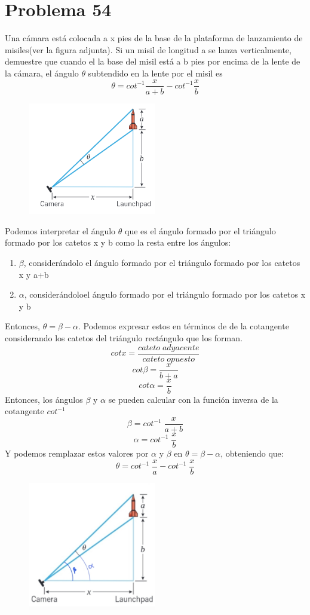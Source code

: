 \documentclass[12pt]{article}
\begin{document}
\section{Problema 54}
Una cámara está colocada a x pies de la base de la 
plataforma de lanzamiento de misiles(ver la figura adjunta). Si un misil
de longitud a se lanza verticalmente, demuestre que cuando el
la base del misil está a b pies por encima de la lente de la cámara, el ángulo $\theta $ subtendido en la lente por el misil es
\[
\theta  = cot ^{-1} \frac{x}{a+b} - cot ^{-1} \frac{x}{b}
\]
\begin{figure}[H]
\centering
\includegraphics[width=0.5\textwidth]{img/cam.png}
\end{figure}
Podemos interpretar el ángulo $\theta$ que es  el ángulo formado por el triángulo formado por los catetos x y  b como la resta entre los ángulos:
\begin{enumerate}
\item $\beta$, considerándolo el ángulo formado por el triángulo formado por los catetos  x y a+b
\item $\alpha$, considerándoloel ángulo formado por el triángulo formado por los catetos x y b
\end{enumerate}
Entonces, $ \theta = \beta  - \alpha$.
Podemos expresar estos en términos de de la cotangente considerando los catetos del triángulo rectángulo que los forman.
\[
cotx= \frac{cateto \; adyacente}{cateto \; opuesto }
\]
\[
cot\beta = \frac{x}{b+a}
\]
\[
cot\alpha = \frac{x}{b}
\]
Entonces, los ángulos $\beta$ y $\alpha$ se pueden calcular con la función inversa de la cotangente $cot^{-1}$
\[
\beta = cot^{-1}\; \frac{x}{a+b}
\]
\[
\alpha = cot^{-1}\;\frac{x}{b}
\]
Y podemos remplazar estos valores por $\alpha$ y $\beta$ en  $ \theta = \beta  - \alpha$, obteniendo que:
\[
 \theta = cot^{-1}\; \frac{x}{a}  - cot^{-1}\;\frac{x}{b}
 \]
\begin{figure}[H]
\centering
\includegraphics[width=0.5\textwidth]{img/ang.jpg}
\end{figure}
\end{document}
